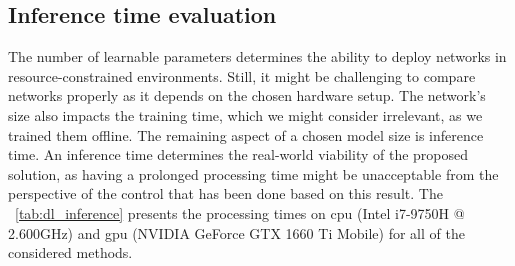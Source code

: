\documentclass[a4paper, 10pt, twoside]{report}
\begin{document}
\subsection{Inference time evaluation}
\label{part:experiments:terrain:inferencetime}

The number of learnable parameters determines the ability to deploy networks in resource-constrained environments. Still, it might be challenging to compare networks properly as it depends on the chosen hardware setup. The network's size also impacts the training time, which we might consider irrelevant, as we trained them offline. The remaining aspect of a chosen model size is inference time. An inference time determines the real-world viability of the proposed solution, as having a prolonged processing time might be unacceptable from the perspective of the control that has been done based on this result. The  \Table~\ref{tab:dl_inference} presents the processing times on \acrshort{cpu} (Intel i7-9750H @ 2.600GHz) and \acrshort{gpu} (NVIDIA GeForce GTX 1660 Ti Mobile) for all of the considered methods.
\end{document}
